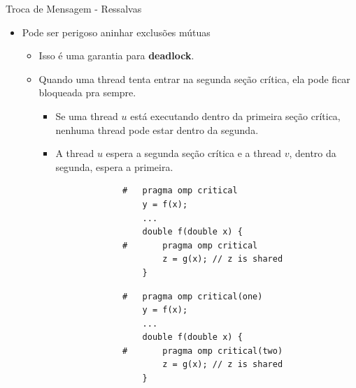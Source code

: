 	\begin{frame}[fragile]{Troca de Mensagem - Ressalvas}
		\begin{itemize}
			\item Pode ser perigoso aninhar exclusões mútuas
			\begin{itemize}
				\item Isso é uma garantia para \textbf{deadlock}.
				\item Quando uma thread tenta entrar na segunda seção crítica, ela pode ficar bloqueada pra sempre.
				\begin{itemize}
					\item Se uma thread $u$ está executando dentro da primeira seção crítica, nenhuma thread pode estar dentro da segunda.
					\item A thread $u$ espera a segunda seção crítica e a thread $v$, dentro da segunda,  espera a primeira.
				\end{itemize}
			\end{itemize}

			\begin{multicols}{2}
				\begin{verbatim}
					#	pragma omp critical
						y = f(x);
						...
						double f(double x) {
					#		pragma omp critical
							z = g(x); // z is shared
						}
				\end{verbatim}
			\columnbreak
				\pause
				\begin{verbatim}
					#	pragma omp critical(one)
						y = f(x);
						...
						double f(double x) {
					#		pragma omp critical(two)
							z = g(x); // z is shared
						}
				\end{verbatim}
			\end{multicols}
		\end{itemize}
\end{frame}

